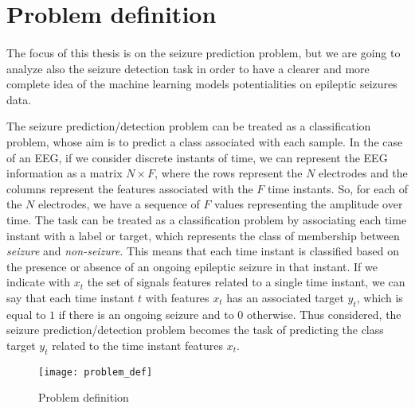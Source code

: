 
\section{Problem definition} \label{sec: problem_definition}
\paragraph{} The focus of this thesis is on the seizure prediction problem, but we are going to analyze also the seizure detection task in order to have a clearer and more complete idea of the machine learning models potentialities on epileptic seizures data.

The seizure prediction/detection problem can be treated as a classification problem, whose aim is to predict a class associated with each sample. In the case of an EEG, if we consider discrete instants of time, we can represent the EEG information as a matrix $N \times F$, where the rows represent the $N$ electrodes and the columns represent the features associated with the $F$ time instants. So, for each of the $N$ electrodes, we have a sequence of $F$ values representing the amplitude over time. The task can be treated as a classification problem by associating each time instant with a label or target, which represents the class of membership between \textit{seizure} and \textit{non-seizure}. This means that each time instant is classified based on the presence or absence of an ongoing epileptic seizure in that instant. If we indicate with $x_t$ the set of signals features related to a single time instant, we can say that each time instant $t$ with features $x_t$ has an associated target $y_t$, which is equal to $1$ if there is an ongoing seizure and to $0$ otherwise. Thus considered, the seizure prediction/detection problem becomes the task of predicting the class target $y_t$ related to the time instant features $x_t$.

\begin{figure}[htbp]
    \centering
    \texttt{[image: problem\_def]}
    \caption{Problem definition}
    \label{fig:problem_def}
\end{figure}

